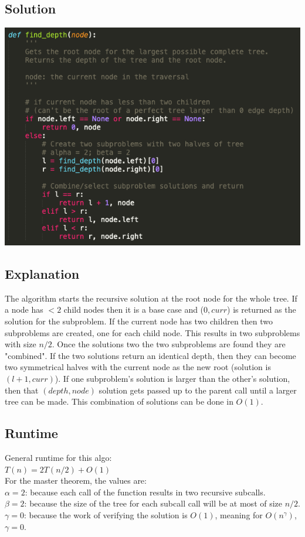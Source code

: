 \documentclass[11pt]{article}
\begin{document}
\subsection*{Solution}
\includegraphics[scale=0.5]{tree.png}

\subsection*{Explanation}
The algorithm starts the recursive solution at the root node for the whole tree. If a node has $<2$ child nodes then it is a base case and ($0, curr$) is returned as the solution for the subproblem. If the current node has two children then two subproblems are created, one for each child node. This results in two subproblems with size $n/2$. Once the solutions two the two subproblems are found they are "combined". If the two solutions return an identical depth, then they can become two symmetrical halves with the current node as the new root (solution is $(l+1, curr)$). If one subproblem's solution is larger than the other's solution, then that $(depth, node)$ solution gets passed up to the parent call until a larger tree can be made. This combination of solutions can be done in $O(1)$.

\subsection*{Runtime}
General runtime for this algo:\\
$T(n) = 2T(n/2) + O(1)$\\

\noindent For the master theorem, the values are:\\
\noindent $\alpha=2$: because each call of the function results in two recursive subcalls.\\
$\beta=2$: because the size of the tree for each subcall call will be at most of size $n/2$.\\
$\gamma=0$: because the work of verifying the solution is $O(1)$, meaning for $O(n^\gamma)$, $\gamma = 0$.\\
\end{document}

